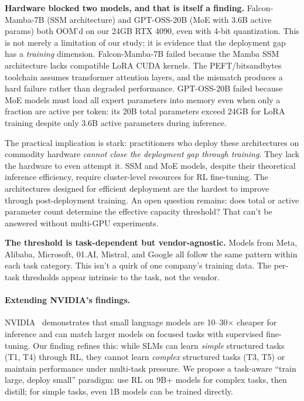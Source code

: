 \documentclass[11pt]{article}
\begin{document}
\textbf{Hardware blocked two models, and that is itself a finding.} Falcon-Mamba-7B (SSM architecture) and GPT-OSS-20B (MoE with 3.6B active params) both OOM'd on our 24GB RTX 4090, even with 4-bit quantization.  This is not merely a limitation of our study; it is evidence that the deployment gap has a \emph{training} dimension.  Falcon-Mamba-7B failed because the Mamba SSM architecture lacks compatible LoRA CUDA kernels.  The PEFT/bitsandbytes toolchain assumes transformer attention layers, and the mismatch produces a hard failure rather than degraded performance.  GPT-OSS-20B failed because MoE models must load all expert parameters into memory even when only a fraction are active per token: its 20B total parameters exceed 24GB for LoRA training despite only 3.6B active parameters during inference.

The practical implication is stark: practitioners who deploy these architectures on commodity hardware \emph{cannot close the deployment gap through training}.  They lack the hardware to even attempt it.  SSM and MoE models, despite their theoretical inference efficiency, require cluster-level resources for RL fine-tuning.  The architectures designed for efficient deployment are the hardest to improve through post-deployment training.  An open question remains: does total or active parameter count determine the effective capacity threshold?  That can't be answered without multi-GPU experiments.

\textbf{The threshold is task-dependent but vendor-agnostic.} Models from Meta, Alibaba, Microsoft, 01.AI, Mistral, and Google all follow the same pattern within each task category.  This isn't a quirk of one company's training data.  The per-task thresholds appear intrinsic to the task, not the vendor.

\paragraph{Extending NVIDIA's findings.}
NVIDIA~\citep{nvidia2025slm} demonstrates that small language models are 10--30$\times$ cheaper for inference and can match larger models on focused tasks with supervised fine-tuning.
Our finding refines this: while SLMs can learn \emph{simple} structured tasks (T1, T4) through RL, they cannot learn \emph{complex} structured tasks (T3, T5) or maintain performance under multi-task pressure.
We propose a task-aware ``train large, deploy small'' paradigm: use RL on 9B+ models for complex tasks, then distill; for simple tasks, even 1B models can be trained directly.
\end{document}
